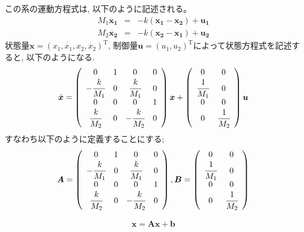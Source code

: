 \documentclass[12pt]{jsarticle}   	%
\begin{document}
\subsection{}
この系の運動方程式は, 以下のように記述される。
\begin{eqnarray}
M_1 \ddot{\bm{x_1}} &=& -k(\bm{x_1} - \bm{x_2}) + \bm{u_1} \\
M_2 \ddot{\bm{x_2}} &=& -k(\bm{x_2} - \bm{x_1}) + \bm{u_2} 
\end{eqnarray}
状態量$\bm{x} = (x_1, \dot{x_1}, x_2, \dot{x_2})^{\mathrm{T}}$, 制御量$\bm{u} = (u_1, u_2)^{\mathrm{T}}$によって状態方程式を記述すると, 以下のようになる. 
\begin{eqnarray}
\dot{\bm{x}} = \left(
    \begin{array}{cccc}
      0 & 1 & 0 & 0 \\
      -\cfrac{k}{M_1} & 0 & \cfrac{k}{M_1} & 0\\
      0 & 0 & 0 & 1 \\
      \cfrac{k}{M_2} & 0 & -\cfrac{k}{M_2}& 0
    \end{array}
  \right) \bm{x} + 
  \left(
    \begin{array}{cc}
      0 & 0 \\
      \cfrac{1}{M_1} & 0\\
      0 & 0 \\
      0 & \cfrac{1}{M_2}
    \end{array}
   \right) \bm{u}
\end{eqnarray}
\newline
すなわち以下のように定義することにする; 
\newline
\begin{eqnarray}
\bm{A} = \left(
    \begin{array}{cccc}
      0 & 1 & 0 & 0 \\
      -\cfrac{k}{M_1} & 0 & \cfrac{k}{M_1} & 0\\
      0 & 0 & 0 & 1 \\
      \cfrac{k}{M_2} & 0 & -\cfrac{k}{M_2}& 0
    \end{array}
  \right), 
\bm{B} = \left(
    \begin{array}{cc}
      0 & 0 \\
      \cfrac{1}{M_1} & 0\\
      0 & 0 \\
      0 & \cfrac{1}{M_2}
    \end{array}
   \right)
\end{eqnarray}

\begin{eqnarray}
\bm{x} = \bm{Ax} + \bm{b}
\end{eqnarray}
\end{document}
